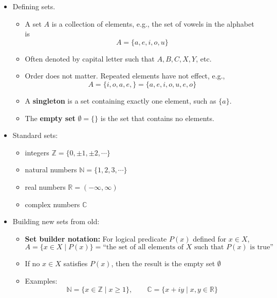 \documentclass[11pt,twoside]{report}
\newcommand{\bbN}{{\mathbb{N}}}
\newcommand{\bbR}{{\mathbb{R}}}
\newcommand{\bbZ}{{\mathbb{Z}}}
\begin{document}
\begin{itemize}
\item Defining sets. 
\begin{itemize}
\item A set $A$ is a collection of elements, e.g., the set of vowels in the alphabet is 
\[
A = \{ a, e, i, o, u\} 
\]
\item Often denoted by capital letter such that $A, B, C, X, Y$, etc.

\item Order does not matter. Repeated elements have not effect, e.g., 
\[
A =  \{ i, o, a, e, \}  = \{a, e, i, o, u, e, o  \} 
\]

\item A \textbf{singleton} is a set containing exactly one element, such as $\{a\}$. 

\item The \textbf{empty set } $\emptyset = \{ \} $ is the set that contains no elements. 
\end{itemize}

\item Standard sets:
\begin{itemize}
\item integers $\bbZ = \{ 0, \pm 1, \pm2, \cdots\}$
\item natural numbers $\bbN = \{ 1,2,3,\cdots\}$
\item real numbers $\bbR = (- \infty, \infty) $
\item complex numbers $\mathbb{C} $%
\end{itemize}

\item Building new sets from old:
\begin{itemize}
\item  \textbf{Set builder notation:}  For logical predicate $P(x)$ defined for $x \in X$, 
\[
A = \{x  \in X \mid P(x)\}  = \text{``the set of all elements of $X$ such that $P(x)$ is true''}
\]

\item If no $x \in X$ satisfies $P(x)$, then the result is the empty set $\emptyset$

\item Examples: 
\[
\bbN = \{ x \in \bbZ \mid x\ge 1\}, \qquad \mathbb{C} = \{ x + i y  \mid x, y \in\bbR\}
\]
\end{itemize}

\end{itemize}
\end{document}
